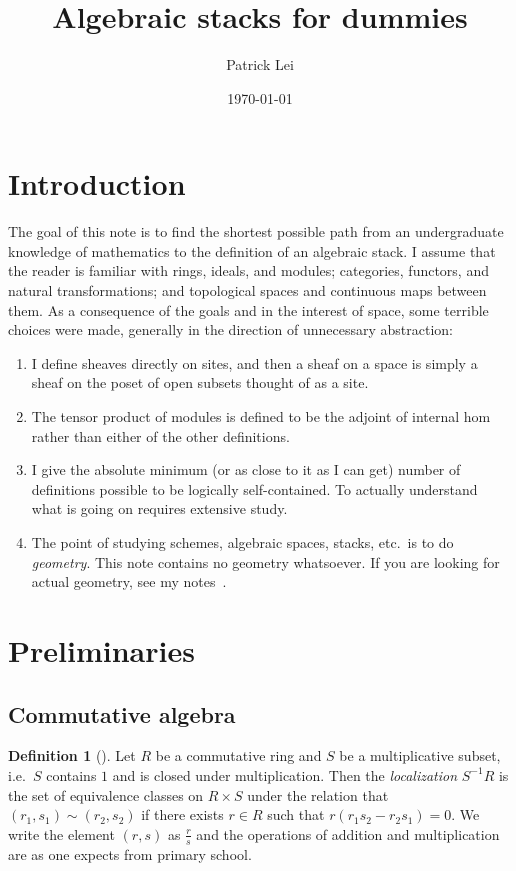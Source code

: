 \documentclass{amsart}
\title{Algebraic stacks for dummies}%
\author{Patrick Lei}
\date{\today}
\theoremstyle{definition}
\newtheorem{defn}[thm]{Definition}
\theoremstyle{remark}
\theoremstyle{plain}
\theoremstyle{definition}
\theoremstyle{remark}
\newcommand{\1}{\mathbf{1}}
\newcommand{\2}{\mathbf{2}}
\newcommand{\3}{\mathbf{3}}
\begin{document}
    
\maketitle

\section{Introduction}

The goal of this note is to find the shortest possible path from an undergraduate knowledge of mathematics to the definition of an algebraic stack. I assume that the reader is familiar with rings, ideals, and modules; categories, functors, and natural transformations; and topological spaces and continuous maps between them. As a consequence of the goals and in the interest of space, some terrible choices were made, generally in the direction of unnecessary abstraction:

\begin{enumerate}
    \item I define sheaves directly on sites, and then a sheaf on a space is simply a sheaf on the poset of open subsets thought of as a site.
    \item The tensor product of modules is defined to be the adjoint of internal hom rather than either of the other definitions.
    \item I give the absolute minimum (or as close to it as I can get) number of definitions possible to be logically self-contained. To actually understand what is going on requires extensive study.
    \item The point of studying schemes, algebraic spaces, stacks, etc.\ is to do \textit{geometry}. This note contains no geometry whatsoever. If you are looking for actual geometry, see my notes~\cite{hk,git,mmp,deformation,hodge,hyperbolicity,ieg,intersection}.
\end{enumerate}


\section{Preliminaries}

\subsection{Commutative algebra}

\begin{defn}[{\cite[Section 1.2]{canotes}}]
    Let $R$ be a commutative ring and $S$ be a multiplicative subset, i.e.\ $S$ contains $1$ and is closed under multiplication. Then the \textit{localization} $S^{-1}R$ is the set of equivalence classes on $R \times S$ under the relation that $(r_1,s_1) \sim (r_2,s_2)$ if there exists $r \in R$ such that $r(r_1 s_2 - r_2 s_1) = 0$. We write the element $(r,s)$ as $\frac{r}{s}$ and the operations of addition and multiplication are as one expects from primary school.
\end{defn}
\end{document}
